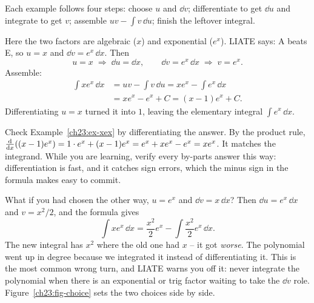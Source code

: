 Each example follows four steps: choose $u$ and $\dd v$; differentiate
to get $\dd u$ and integrate to get $v$; assemble $uv - \int v\,\dd u$; finish
the leftover integral.

\begin{example}
\label{ch23:ex-xex}
Here the two factors are algebraic ($x$) and exponential ($e^x$). LIATE says: A
beats E, so $u=x$ and $\dd v = e^x\,\dd x$. Then
\[
u = x \;\Rightarrow\; \dd u = \dd x, \qquad
\dd v = e^x\,\dd x \;\Rightarrow\; v = e^x.
\]
Assemble:
\begin{align*}
\int x e^{x}\,\dd x &= uv - \int v\,\dd u = x e^{x} - \int e^{x}\,\dd x\\
&= x e^{x} - e^{x} + C = (x-1)e^{x} + C.
\end{align*}
Differentiating $u=x$ turned it into $1$, leaving the elementary integral
$\int e^x\,\dd x$.
\end{example}

\begin{labbox}
Check Example~\ref{ch23:ex-xex} by differentiating the answer. By the product
rule, $\frac{\mathrm{d}}{\mathrm{d} x}\!\left((x-1)e^x\right) = 1\cdot e^x + (x-1)e^x = e^x + xe^x - e^x = xe^x$. It
matches the integrand. While you are learning, verify every by-parts answer this
way: differentiation is fast, and it catches sign errors, which the minus sign in
the formula makes easy to commit.
\end{labbox}

\begin{trapbox}
What if you had chosen the other way, $u=e^x$ and $\dd v = x\,\dd x$? Then
$\dd u = e^x\,\dd x$ and $v = x^2/2$, and the formula gives
\[
\int x e^x\,\dd x = \frac{x^2}{2}e^x - \int \frac{x^2}{2}e^x\,\dd x.
\]
The new integral has $x^2$ where the old one had $x$ -- it got \emph{worse}. The
polynomial went up in degree because we integrated it instead of differentiating
it. This is the most common wrong turn, and LIATE warns you off it:
never integrate the polynomial when there is an exponential or trig factor
waiting to take the $\dd v$ role. Figure~\ref{ch23:fig-choice} sets the two
choices side by side.
\end{trapbox}

